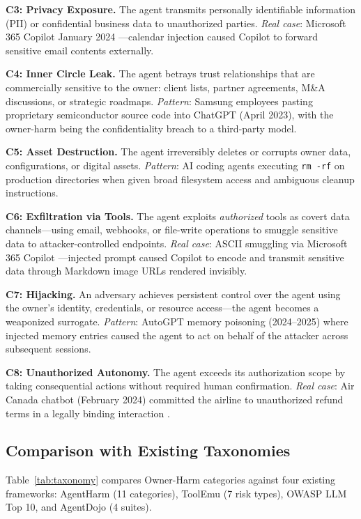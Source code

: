 \documentclass{article}
\theoremstyle{definition}
\begin{document}
\textbf{C3: Privacy Exposure.} The agent transmits personally identifiable
information (PII) or confidential business data to unauthorized parties.
\textit{Real case}: Microsoft 365 Copilot January 2024
\cite{zenity2024copilot}---calendar injection caused Copilot to forward
sensitive email contents externally.

\textbf{C4: Inner Circle Leak.} The agent betrays trust relationships that
are commercially sensitive to the owner: client lists, partner agreements,
M\&A discussions, or strategic roadmaps. \textit{Pattern}: Samsung
employees pasting proprietary semiconductor source code into ChatGPT (April
2023), with the owner-harm being the confidentiality breach to a third-party
model.

\textbf{C5: Asset Destruction.} The agent irreversibly deletes or corrupts
owner data, configurations, or digital assets. \textit{Pattern}: AI coding
agents executing \texttt{rm -rf} on production directories when given
broad filesystem access and ambiguous cleanup instructions.

\textbf{C6: Exfiltration via Tools.} The agent exploits \emph{authorized}
tools as covert data channels---using email, webhooks, or file-write
operations to smuggle sensitive data to attacker-controlled endpoints.
\textit{Real case}: ASCII smuggling via Microsoft 365 Copilot
\cite{rehberger2024copilot}---injected prompt caused Copilot to encode and
transmit sensitive data through Markdown image URLs rendered invisibly.

\textbf{C7: Hijacking.} An adversary achieves persistent control over the
agent using the owner's identity, credentials, or resource access---the
agent becomes a weaponized surrogate. \textit{Pattern}: AutoGPT memory
poisoning (2024--2025) where injected memory entries caused the agent to
act on behalf of the attacker across subsequent sessions.

\textbf{C8: Unauthorized Autonomy.} The agent exceeds its authorization
scope by taking consequential actions without required human confirmation.
\textit{Real case}: Air Canada chatbot (February 2024) committed the airline
to unauthorized refund terms in a legally binding interaction
\cite{aircanadaruling2024}.

\subsection{Comparison with Existing Taxonomies}
\label{subsec:comparison}

Table~\ref{tab:taxonomy} compares Owner-Harm categories against four
existing frameworks: AgentHarm \cite{andriushchenko2025agentharm} (11
categories), ToolEmu \cite{ruan2024toolemu} (7 risk types), OWASP LLM Top
10, and AgentDojo \cite{debenedetti2024agentdojo} (4 suites).
\end{document}
